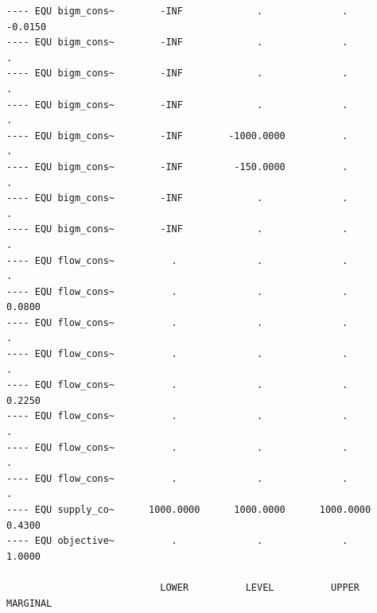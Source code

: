 \documentclass[11pt]{article}
\begin{document}
\begin{verbatim}
---- EQU bigm_cons~        -INF             .              .            -0.0150      
---- EQU bigm_cons~        -INF             .              .              .          
---- EQU bigm_cons~        -INF             .              .              .          
---- EQU bigm_cons~        -INF             .              .              .          
---- EQU bigm_cons~        -INF        -1000.0000          .              .          
---- EQU bigm_cons~        -INF         -150.0000          .              .          
---- EQU bigm_cons~        -INF             .              .              .          
---- EQU bigm_cons~        -INF             .              .              .          
---- EQU flow_cons~          .              .              .              .          
---- EQU flow_cons~          .              .              .             0.0800      
---- EQU flow_cons~          .              .              .              .          
---- EQU flow_cons~          .              .              .              .          
---- EQU flow_cons~          .              .              .             0.2250      
---- EQU flow_cons~          .              .              .              .          
---- EQU flow_cons~          .              .              .              .          
---- EQU flow_cons~          .              .              .              .          
---- EQU supply_co~      1000.0000      1000.0000      1000.0000         0.4300      
---- EQU objective~          .              .              .             1.0000      

                           LOWER          LEVEL          UPPER         MARGINAL


\end{verbatim}
\end{document}
